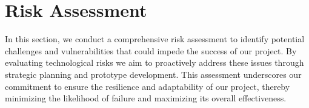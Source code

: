 \section{Risk Assessment}

In this section, we conduct a comprehensive risk assessment to identify potential challenges and vulnerabilities that could impede the success of our project.
By evaluating technological risks we aim to proactively address these issues through strategic planning and prototype development.
This assessment underscores our commitment to ensure the resilience and adaptability of our project, thereby minimizing the likelihood of failure and maximizing its overall effectiveness.


